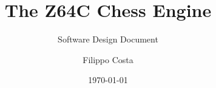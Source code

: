 \documentclass[11pt]{scrbook}
\title{The Z64C Chess Engine}
\subtitle{Software Design Document}
\author{Filippo Costa}
\date{\today}
\begin{document}
\maketitle

\tableofcontents{}
\frontmatter

\mainmatter





\nocite{*}

\printbibliography

%
%
%
%
%
%
\end{document}
